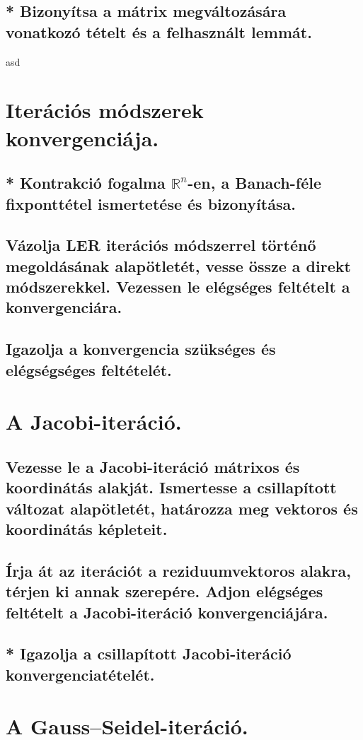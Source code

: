 \documentclass{article}
\begin{document}
        \subsection{* Bizonyítsa a mátrix megváltozására vonatkozó tételt és a felhasznált lemmát.}

asd
    \section{Iterációs módszerek konvergenciája.}
        \subsection{* Kontrakció fogalma $\mathbb{R}^n$-en, a Banach-féle fixponttétel ismertetése és bizonyítása.}
        \subsection{Vázolja LER iterációs módszerrel történő megoldásának alapötletét, vesse össze a direkt módszerekkel. Vezessen le elégséges feltételt a konvergenciára.}
        \subsection{Igazolja a konvergencia szükséges és elégségséges feltételét.}


    \section{A Jacobi-iteráció.}
        \subsection{Vezesse le a Jacobi-iteráció mátrixos és koordinátás alakját. Ismertesse a csillapított változat alapötletét, határozza meg vektoros és koordinátás képleteit.}
        \subsection{Írja át az iterációt a reziduumvektoros alakra, térjen ki annak szerepére. Adjon elégséges feltételt a Jacobi-iteráció konvergenciájára.}
        \subsection{* Igazolja a csillapított Jacobi-iteráció konvergenciatételét.}


    \section{A Gauss–Seidel-iteráció.}
\end{document}
